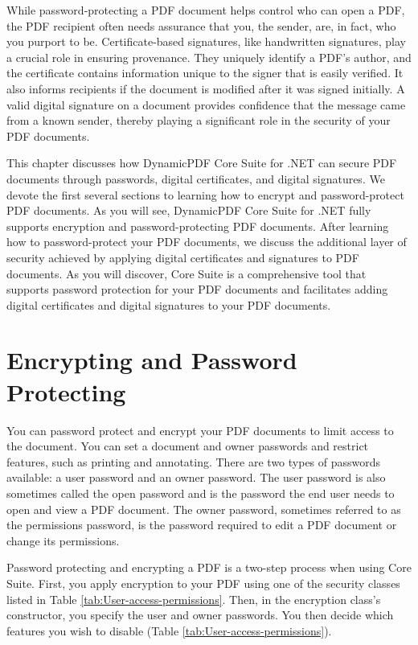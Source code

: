 \documentclass[american]{tufte-book}
\numberwithin{equation}{section}
\numberwithin{figure}{section}
\begin{document}
{While password-protecting a PDF document helps control who can open
a PDF, the PDF recipient often needs assurance that you, the sender,
are, in fact, who you purport to be. Certificate-based signatures,
like handwritten signatures, play a crucial role in ensuring provenance.
They uniquely identify a PDF's author, and the certificate contains
information unique to the signer that is easily verified. It also
informs recipients if the document is modified after it was signed
initially. A valid digital signature on a document provides confidence
that the message came from a known sender, thereby playing a significant
role in the security of your PDF documents.

This chapter discusses how DynamicPDF Core Suite for .NET can
secure PDF documents through passwords, digital certificates, and
digital signatures. We devote the first several sections to learning
how to encrypt and password-protect PDF documents. As you will see,
 DynamicPDF Core Suite for .NET fully supports encryption and password-protecting
PDF documents. After learning how to password-protect your PDF documents,
we discuss the additional layer of security achieved by applying digital
certificates and signatures to PDF documents. As you will discover,
Core Suite is a comprehensive tool that supports password protection
for your PDF documents and facilitates adding digital certificates
and digital signatures to your PDF documents. 

\section{Encrypting and Password Protecting}

You can password protect and encrypt your PDF documents to limit access
to the document. You can set a document and owner passwords and restrict
features, such as printing and annotating. There are two types of
passwords available: a user password and an owner password. The user
password is also sometimes called the open password and is the password
the end user needs to open and view a PDF document. The owner password,
sometimes referred to as the permissions password, is the password
required to edit a PDF document or change its permissions. 

Password protecting and encrypting a PDF is a two-step process when
using Core Suite. First, you apply encryption to your PDF using one
of the security classes listed in Table \ref{tab:User-access-permissions}.
Then, in the encryption class’s constructor, you specify the user
and owner passwords. You then decide which features you wish to disable
(Table \ref{tab:User-access-permissions}). 

}
\end{document}
